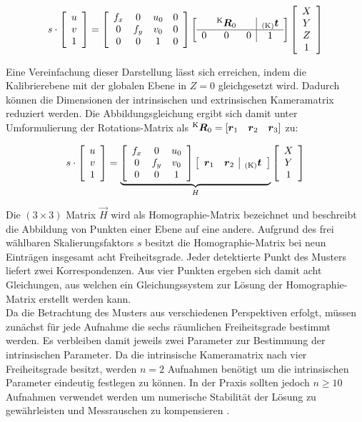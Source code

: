 \begin{equation}
s \cdot 
\mat{c}{
u\\
v\\
1
}
=
\mat{cccc}{
f_x & 0 & u_0 & 0\\
0 & f_y & v_0 & 0\\
0 & 0 & 1 & 0
}
\mat{ccc|c}{
  & \rmat{K}{0} &   & \ve{K}{t} \\
\hline
0 &      0      & 0 & 1 \\
}
\mat{c}{
X\\
Y\\
Z\\
1
}
\end{equation}

Eine Vereinfachung dieser Darstellung lässt sich erreichen, indem die Kalibrierebene mit der globalen Ebene in $Z=0$ gleichgesetzt wird. Dadurch können die Dimensionen der intrinsischen und extrinsischen Kameramatrix reduziert werden. Die Abbildungsgleichung ergibt sich damit unter Umformulierung der Rotations-Matrix als $\rmat{K}{0} = [\vec{r}_1 \quad \vec{r}_2 \quad \vec{r}_3]$ zu:

\begin{equation}
s \cdot
\mat{c}{
u\\
v\\
1
}
 = 
\underbrace{
\mat{ccc}{ 
	f_x & 0 & u_0\\
	0 & f_y & v_0\\
	0 & 0 & 1
}
\mat{cc|c}{ 
	\vec{r}_1 & \vec{r}_2 & \ve{K}{t} \\
}
}_H
\mat{c}{
	X\\
	Y\\
	1
}
\end{equation}

Die $(3 \times 3)$ Matrix $\vec{H}$ wird als Homographie-Matrix bezeichnet und beschreibt die Abbildung von Punkten einer Ebene auf eine andere. Aufgrund des frei wählbaren Skalierungsfaktors $s$ besitzt die Homographie-Matrix bei neun Einträgen insgesamt acht Freiheitsgrade. Jeder detektierte Punkt des Musters liefert zwei Korrespondenzen. Aus vier Punkten ergeben sich damit acht Gleichungen, aus welchen ein Gleichungssystem zur Lösung der Homographie-Matrix erstellt werden kann.\\
Da die Betrachtung des Musters aus verschiedenen Perspektiven erfolgt, müssen zunächst für jede Aufnahme die sechs räumlichen Freiheitsgrade bestimmt werden. Es verbleiben damit jeweils zwei Parameter zur Bestimmung der intrinsischen Parameter. Da die intrinsische Kameramatrix nach  vier Freiheitsgrade besitzt, werden $n = 2$ Aufnahmen benötigt um die intrinsischen Parameter eindeutig festlegen zu können. In der Praxis sollten jedoch $n \geq 10$ Aufnahmen verwendet werden um numerische Stabilität der Lösung zu gewährleisten und Messrauschen zu kompensieren \cite{Bradsky2008}.\\

